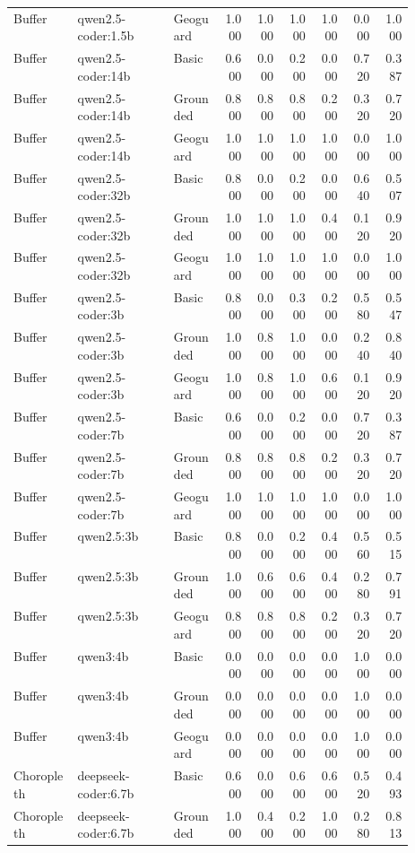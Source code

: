 \begin{longtable}{p{0.16\linewidth}p{0.24\linewidth}p{0.12\linewidth}rrrrrr}
Buffer & qwen2.5-coder:1.5b & Geoguard & 1.000 & 1.000 & 1.000 & 1.000 & 0.000 & 1.000 \\
Buffer & qwen2.5-coder:14b & Basic & 0.600 & 0.000 & 0.200 & 0.000 & 0.720 & 0.387 \\
Buffer & qwen2.5-coder:14b & Grounded & 0.800 & 0.800 & 0.800 & 0.200 & 0.320 & 0.720 \\
Buffer & qwen2.5-coder:14b & Geoguard & 1.000 & 1.000 & 1.000 & 1.000 & 0.000 & 1.000 \\
Buffer & qwen2.5-coder:32b & Basic & 0.800 & 0.000 & 0.200 & 0.000 & 0.640 & 0.507 \\
Buffer & qwen2.5-coder:32b & Grounded & 1.000 & 1.000 & 1.000 & 0.400 & 0.120 & 0.920 \\
Buffer & qwen2.5-coder:32b & Geoguard & 1.000 & 1.000 & 1.000 & 1.000 & 0.000 & 1.000 \\
Buffer & qwen2.5-coder:3b & Basic & 0.800 & 0.000 & 0.300 & 0.200 & 0.580 & 0.547 \\
Buffer & qwen2.5-coder:3b & Grounded & 1.000 & 0.800 & 1.000 & 0.000 & 0.240 & 0.840 \\
Buffer & qwen2.5-coder:3b & Geoguard & 1.000 & 0.800 & 1.000 & 0.600 & 0.120 & 0.920 \\
Buffer & qwen2.5-coder:7b & Basic & 0.600 & 0.000 & 0.200 & 0.000 & 0.720 & 0.387 \\
Buffer & qwen2.5-coder:7b & Grounded & 0.800 & 0.800 & 0.800 & 0.200 & 0.320 & 0.720 \\
Buffer & qwen2.5-coder:7b & Geoguard & 1.000 & 1.000 & 1.000 & 1.000 & 0.000 & 1.000 \\
Buffer & qwen2.5:3b & Basic & 0.800 & 0.000 & 0.200 & 0.400 & 0.560 & 0.515 \\
Buffer & qwen2.5:3b & Grounded & 1.000 & 0.600 & 0.600 & 0.400 & 0.280 & 0.791 \\
Buffer & qwen2.5:3b & Geoguard & 0.800 & 0.800 & 0.800 & 0.200 & 0.320 & 0.720 \\
Buffer & qwen3:4b & Basic & 0.000 & 0.000 & 0.000 & 0.000 & 1.000 & 0.000 \\
Buffer & qwen3:4b & Grounded & 0.000 & 0.000 & 0.000 & 0.000 & 1.000 & 0.000 \\
Buffer & qwen3:4b & Geoguard & 0.000 & 0.000 & 0.000 & 0.000 & 1.000 & 0.000 \\
Choropleth & deepseek-coder:6.7b & Basic & 0.600 & 0.000 & 0.600 & 0.600 & 0.520 & 0.493 \\
Choropleth & deepseek-coder:6.7b & Grounded & 1.000 & 0.400 & 0.200 & 1.000 & 0.280 & 0.813 \\

\end{longtable}
